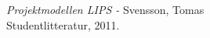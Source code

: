 \documentclass[a4paper,12pt]{article}
\begin{document}
% 
\newpage
\appendix

\newpage


\begin{thebibliography}{99}
\textit{Projektmodellen LIPS - } Svensson, Tomas
\\Studentlitteratur, 2011.
\end{thebibliography}
\end{document}
